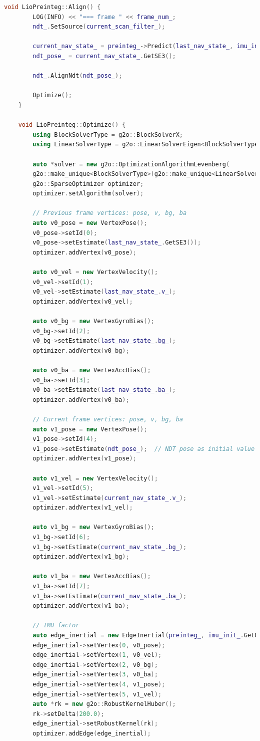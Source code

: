 \begin{lstlisting}[language=c++,caption=src/ch8/lio-preinteg/lio_preinteg.cc]
	void LioPreinteg::Align() {
		LOG(INFO) << "=== frame " << frame_num_;
		ndt_.SetSource(current_scan_filter_);
		
		current_nav_state_ = preinteg_->Predict(last_nav_state_, imu_init_.GetGravity());
		ndt_pose_ = current_nav_state_.GetSE3();
		
		ndt_.AlignNdt(ndt_pose_);
		
		Optimize();
	}
	
	void LioPreinteg::Optimize() {
		using BlockSolverType = g2o::BlockSolverX;
		using LinearSolverType = g2o::LinearSolverEigen<BlockSolverType::PoseMatrixType>;
		
		auto *solver = new g2o::OptimizationAlgorithmLevenberg(
		g2o::make_unique<BlockSolverType>(g2o::make_unique<LinearSolverType>()));
		g2o::SparseOptimizer optimizer;
		optimizer.setAlgorithm(solver);
		
		// Previous frame vertices: pose, v, bg, ba
		auto v0_pose = new VertexPose();
		v0_pose->setId(0);
		v0_pose->setEstimate(last_nav_state_.GetSE3());
		optimizer.addVertex(v0_pose);
		
		auto v0_vel = new VertexVelocity();
		v0_vel->setId(1);
		v0_vel->setEstimate(last_nav_state_.v_);
		optimizer.addVertex(v0_vel);
		
		auto v0_bg = new VertexGyroBias();
		v0_bg->setId(2);
		v0_bg->setEstimate(last_nav_state_.bg_);
		optimizer.addVertex(v0_bg);
		
		auto v0_ba = new VertexAccBias();
		v0_ba->setId(3);
		v0_ba->setEstimate(last_nav_state_.ba_);
		optimizer.addVertex(v0_ba);
		
		// Current frame vertices: pose, v, bg, ba
		auto v1_pose = new VertexPose();
		v1_pose->setId(4);
		v1_pose->setEstimate(ndt_pose_);  // NDT pose as initial value
		optimizer.addVertex(v1_pose);
		
		auto v1_vel = new VertexVelocity();
		v1_vel->setId(5);
		v1_vel->setEstimate(current_nav_state_.v_);
		optimizer.addVertex(v1_vel);
		
		auto v1_bg = new VertexGyroBias();
		v1_bg->setId(6);
		v1_bg->setEstimate(current_nav_state_.bg_);
		optimizer.addVertex(v1_bg);
		
		auto v1_ba = new VertexAccBias();
		v1_ba->setId(7);
		v1_ba->setEstimate(current_nav_state_.ba_);
		optimizer.addVertex(v1_ba);
		
		// IMU factor
		auto edge_inertial = new EdgeInertial(preinteg_, imu_init_.GetGravity());
		edge_inertial->setVertex(0, v0_pose);
		edge_inertial->setVertex(1, v0_vel);
		edge_inertial->setVertex(2, v0_bg);
		edge_inertial->setVertex(3, v0_ba);
		edge_inertial->setVertex(4, v1_pose);
		edge_inertial->setVertex(5, v1_vel);
		auto *rk = new g2o::RobustKernelHuber();
		rk->setDelta(200.0);
		edge_inertial->setRobustKernel(rk);
		optimizer.addEdge(edge_inertial);
		

\end{lstlisting}
